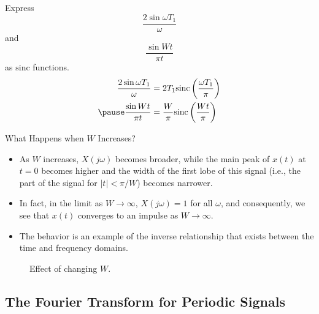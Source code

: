 \begin{frame}
    Express
    \begin{equation*}
        \frac{2 \sin \omega T_1}{\omega}
    \end{equation*}
    and
    \begin{equation*}
        \frac{\sin W t}{\pi t}
    \end{equation*}
    as $\mathrm{sinc}$ functions.
    \pause
    {
        \begin{equation*}
            \begin{aligned}
                \frac{2 \sin \omega T_1}{\omega} &= 2T_1 \mathrm{sinc}\left(\frac{\omega T_1}{\pi}\right)\\ \pause
                \frac{\sin W t}{\pi t} &= \frac{W}{\pi} \mathrm{sinc}\left(\frac{W t}{\pi}\right)\\
            \end{aligned}
        \end{equation*}
    }
\end{frame}

\begin{frame}{What Happens when $W$ Increases?}
{
    \begin{itemize}[<+->]
      \item As $W$ increases, $X(j\omega)$ becomes broader, while the main peak of $x(t)$ at $t = 0$ becomes higher and the width of the first lobe of this signal (i.e., the part of the signal for $|t| < \pi/W$) becomes narrower.
      \item In fact, in the limit as $W \rightarrow \infty$, $X(j\omega) = 1$ for all $\omega$, and consequently, we see that $x(t)$ converges to an impulse as $W \rightarrow \infty$.
      \item The behavior is an example of the inverse relationship that exists between the time and frequency domains.
    \end{itemize}
}
\end{frame}

\begin{frame}[plain]
    {
        \begin{figure}
          \centering
          
          \caption{Effect of changing $W$.}\label{fi:time_freq_scaling}
        \end{figure}
    }

\end{frame}

\subsection{The Fourier Transform for Periodic Signals}

